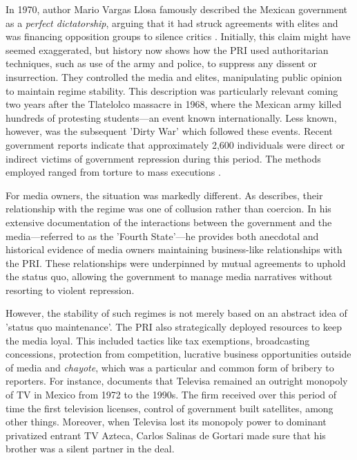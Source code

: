 In 1970, author Mario Vargas Llosa famously described the Mexican government as a \textit{perfect dictatorship}, arguing that it had struck agreements with elites and was financing opposition groups to silence critics \citep{DictaduraPerf-Llosa}. Initially, this claim might have seemed exaggerated, but history now shows how the PRI used authoritarian techniques, such as use of the army and police, to suppress any dissent or insurrection. They controlled the media and elites, manipulating public opinion to maintain regime stability. This description was particularly relevant coming two years after the Tlatelolco massacre in 1968, where the Mexican army killed hundreds of protesting students—an event known internationally. Less known, however, was the subsequent 'Dirty War' which followed these events. Recent government reports indicate that approximately 2,600 individuals were direct or indirect victims of government repression during this period. The methods employed ranged from torture to mass executions \citep{ComisionParaVerdad}.

For media owners, the situation was markedly different. As \cite{FourthState-Lawson-Book} describes, their relationship with the regime was one of collusion rather than coercion. In his extensive documentation of the interactions between the government and the media—referred to as the 'Fourth State'—he provides both anecdotal and historical evidence of media owners maintaining business-like relationships with the PRI. These relationships were underpinned by mutual agreements to uphold the status quo, allowing the government to manage media narratives without resorting to violent repression.

However, the stability of such regimes is not merely based on an abstract idea of 'status quo maintenance'. The PRI also strategically deployed resources to keep the media loyal. This included tactics like tax exemptions, broadcasting concessions, protection from competition, lucrative business opportunities outside of media and \textit{chayote}, which was a particular and common form of bribery to reporters. For instance, \cite{FourthState-Lawson-Book} documents that Televisa remained an outright monopoly of TV in Mexico from 1972 to the 1990s. The firm received over this period of time the first television licenses, control of government built satellites, among other things. Moreover, when Televisa lost its monopoly power to dominant privatized entrant TV Azteca, Carlos Salinas de Gortari made sure that his brother was a silent partner in the deal. 

